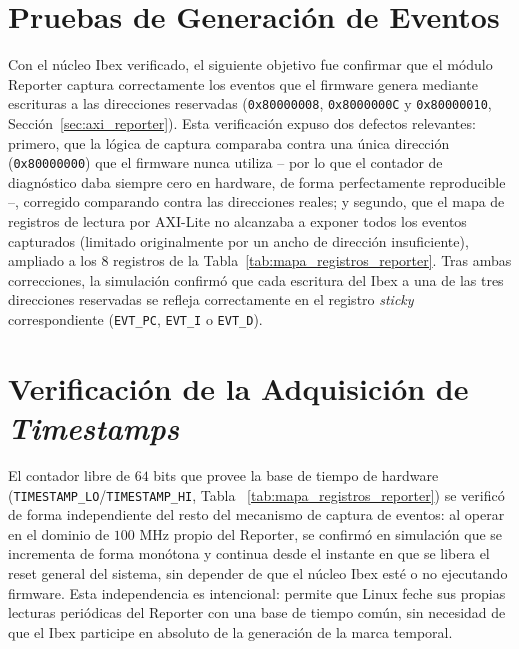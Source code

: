 
\section{Pruebas de Generación de Eventos}
\label{sec:pruebas_eventos}

Con el núcleo Ibex verificado, el siguiente objetivo fue confirmar que el
módulo Reporter captura correctamente los eventos que el firmware genera
mediante escrituras a las direcciones reservadas (\texttt{0x80000008},
\texttt{0x8000000C} y \texttt{0x80000010}, Sección~\ref{sec:axi_reporter}).
Esta verificación expuso dos defectos relevantes: primero, que la lógica
de captura comparaba contra una única dirección (\texttt{0x80000000}) que
el firmware nunca utiliza -- por lo que el contador de diagnóstico daba
siempre cero en hardware, de forma perfectamente reproducible --,
corregido comparando contra las direcciones reales; y segundo, que el mapa
de registros de lectura por AXI-Lite no alcanzaba a exponer todos los
eventos capturados (limitado originalmente por un ancho de dirección
insuficiente), ampliado a los $8$ registros de la
Tabla~\ref{tab:mapa_registros_reporter}. Tras ambas correcciones, la
simulación confirmó que cada escritura del Ibex a una de las tres
direcciones reservadas se refleja correctamente en el registro
\textit{sticky} correspondiente (\texttt{EVT\_PC}, \texttt{EVT\_I} o
\texttt{EVT\_D}).


\section{Verificación de la Adquisición de \textit{Timestamps}}
\label{sec:verificacion_timestamps}

El contador libre de $64$ bits que provee la base de tiempo de hardware
(\texttt{TIMESTAMP\_LO}/\texttt{TIMESTAMP\_HI}, Tabla~
\ref{tab:mapa_registros_reporter}) se verificó de forma independiente del
resto del mecanismo de captura de eventos: al operar en el dominio de
$100\text{ MHz}$ propio del Reporter, se confirmó en simulación que se
incrementa de forma monótona y continua desde el instante en que se libera
el reset general del sistema, sin depender de que el núcleo Ibex esté o no
ejecutando firmware. Esta independencia es intencional: permite que Linux
feche sus propias lecturas periódicas del Reporter con una base de tiempo
común, sin necesidad de que el Ibex participe en absoluto de la generación
de la marca temporal.

